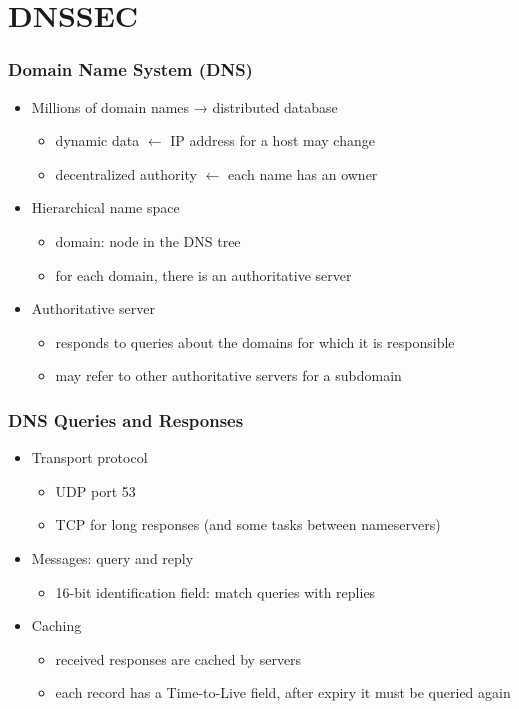 \documentclass[final]{article}
\begin{document}
\section{DNSSEC}
\subsubsection*{Domain Name System (DNS)}
\begin{itemize}[nosep]
    \item Millions of domain names → distributed database
          \begin{itemize}[nosep]
              \item dynamic data $\leftarrow$ IP address for a host may change
              \item decentralized authority $\leftarrow$ each name has an owner
          \end{itemize}
    \item Hierarchical name space
          \begin{itemize}[nosep]
              \item domain: node in the DNS tree
              \item for each domain, there is an authoritative server
          \end{itemize}
    \item Authoritative server
          \begin{itemize}[nosep]
              \item responds to queries about the domains for which it is responsible
              \item may refer to other authoritative servers for a subdomain
          \end{itemize}
\end{itemize}
\subsubsection*{DNS Queries and Responses}
\begin{itemize}[nosep]
    \item Transport protocol
          \begin{itemize}[nosep]
              \item UDP port 53
              \item TCP for long responses (and some tasks between nameservers)
          \end{itemize}
    \item Messages: query and reply
          \begin{itemize}[nosep]
              \item 16-bit identification field: match queries with replies
          \end{itemize}
    \item Caching
          \begin{itemize}[nosep]
              \item received responses are cached by servers
              \item each record has a Time-to-Live field, after expiry it must be queried again
          \end{itemize}
\end{itemize}
\end{document}
